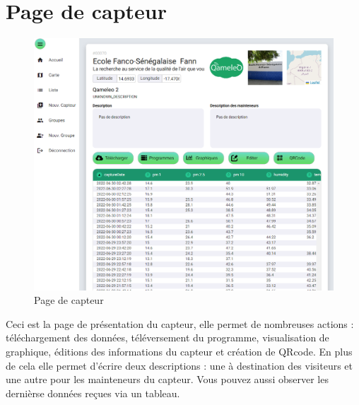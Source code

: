 \section{Page de capteur}\label{sec:page-de-capteur}

    \begin{figure}[H]
        \begin{center}
            \includegraphics[width=12cm]{resources/sensor}
        \end{center}
        \caption{Page de capteur}
        \label{fig:page-de-capteur}
    \end{figure}

    Ceci est la page de présentation du capteur, elle permet de nombreuses actions :
    téléchargement des données, téléversement du programme, visualisation de graphique,
    éditions des informations du capteur et création de QRcode.
    En plus de cela elle permet d'écrire deux descriptions :
    une à destination des visiteurs et une autre pour les mainteneurs du capteur.
    Vous pouvez aussi observer les dernièrse données reçues via un tableau.
